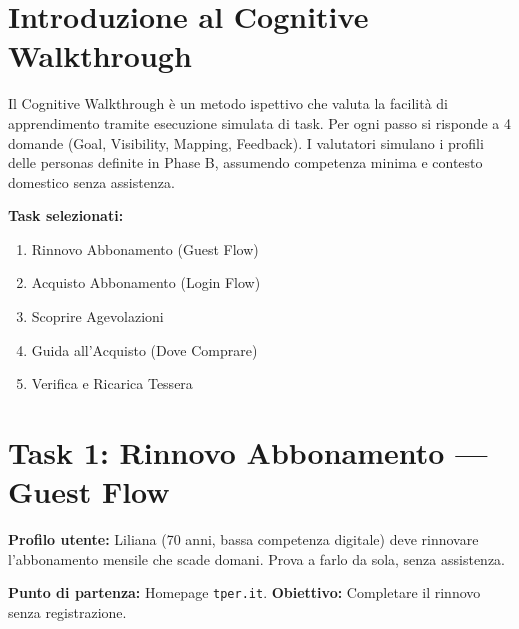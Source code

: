 \documentclass[11pt,a4paper]{article}
\begin{document}
\vspace{0.3cm}

\section{Introduzione al Cognitive Walkthrough}

\begin{tcolorbox}[colback=backgroundColor,colframe=borderColor,arc=2mm]
\small
Il Cognitive Walkthrough \`e un metodo ispettivo che valuta la facilit\`a di apprendimento tramite esecuzione simulata di task. Per ogni passo si risponde a 4 domande (Goal, Visibility, Mapping, Feedback). I valutatori simulano i profili delle personas definite in Phase B, assumendo competenza minima e contesto domestico senza assistenza.

\vspace{0.2cm}
\noindent\textbf{Task selezionati:}
\begin{enumerate}
  \item Rinnovo Abbonamento (Guest Flow)
  \item Acquisto Abbonamento (Login Flow)
  \item Scoprire Agevolazioni
  \item Guida all'Acquisto (Dove Comprare)
  \item Verifica e Ricarica Tessera
\end{enumerate}
\end{tcolorbox}

\vspace{0.5cm}

\section{Task 1: Rinnovo Abbonamento --- Guest Flow}

\begin{tcolorbox}[colback=primaryColor!10,colframe=primaryColor,arc=2mm]
\small
\textbf{Profilo utente:} Liliana (70 anni, bassa competenza digitale) deve rinnovare l'abbonamento mensile che scade domani. Prova a farlo da sola, senza assistenza.

\textbf{Punto di partenza:} Homepage \texttt{tper.it}. \textbf{Obiettivo:} Completare il rinnovo senza registrazione.
\end{tcolorbox}
\end{document}
